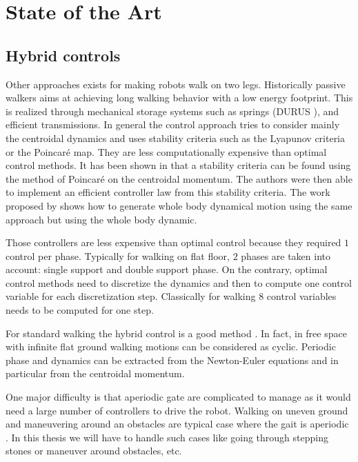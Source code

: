 \section*{State of the Art}

\subsection*{Hybrid controls}

Other approaches exists for making robots walk on two legs.
Historically passive walkers aims at achieving long walking behavior with
a low energy footprint. This is realized through mechanical storage systems
such as springs (DURUS \cite{reherrealizing}), and efficient transmissions.
In general the control approach tries to consider mainly the centroidal dynamics
and uses stability criteria such as the Lyapunov criteria or the Poincar\'e map.
They are less computationally expensive than optimal control methods.
It has been shown in \cite{RazaviBCG15} that a stability criteria can be found using the method of Poincar\'e on the centroidal momentum.
The authors were then able to implement an efficient controller law from this stability criteria.
The work proposed by \cite{KaddarAC15} shows how to generate whole body dynamical motion using the same approach but using the whole body dynamic.

Those controllers are less expensive than optimal control because they required $1$  control per phase.
Typically for walking on flat floor, $2$ phases are taken into account: single support and double support phase.
On the contrary, optimal control methods need to discretize the dynamics and then to compute one control variable for each discretization step.
Classically for walking $8$ control variables needs to be computed for one step.

For standard walking the hybrid control is a good method \cite{westervelt2007feedback}.
In fact, in free space with infinite flat ground walking motions can be considered as cyclic.
Periodic phase and dynamics can be extracted from the Newton-Euler equations and in particular from the centroidal momentum.

One major difficulty is that aperiodic gate are complicated to manage as it would need a large number of controllers to drive the robot.
Walking on uneven ground and maneuvering around an obstacles are typical case where the gait is aperiodic \cite{grizzle20103d}.
In this thesis we will have to handle such cases like going through stepping stones or maneuver around obstacles, etc.

